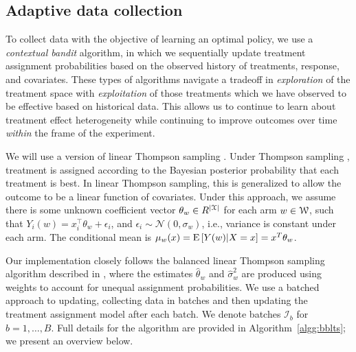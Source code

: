 \documentclass[letterpaper, 12pt, parskip=full,]{scrartcl}
\begin{document}
\subsection{Adaptive data collection}\label{adaptiveagent}

To collect data with the objective of learning an optimal policy, we use a \textit{contextual bandit} algorithm, in which we sequentially update treatment assignment probabilities based on the observed history of treatments, response, and covariates. These types of algorithms navigate a tradeoff in \textit{exploration} of the treatment space with \textit{exploitation} of those treatments which we have observed to be effective based on historical data. This allows us to continue to learn about treatment effect heterogeneity while continuing to improve outcomes over time \textit{within} the frame of the experiment. 

We will use a version of linear Thompson sampling \citep{agrawal2013thompson}. Under Thompson sampling \citep{thompson1933likelihood,thompson1935theory}, treatment is assigned according to the Bayesian posterior probability that each treatment is best. In linear Thompson sampling, this is generalized to allow the outcome to be a linear function of covariates. Under this approach, we assume there is some unknown coefficient vector $\theta_w\in R^{|{\EuScript X}|}$ for each arm $w \in {\EuScript W}$, such that $Y_i(w) = x_i^\top \theta_w + \epsilon_i$, and $\epsilon_i\sim \mathcal{N}(0, \sigma_w)$, i.e., variance is constant under each arm. The conditional mean is $\mu_w(x) = {\textrm E}\,[Y(w)|X=x] = x^T \theta_w$. 



Our implementation closely follows the balanced linear Thompson sampling algorithm described in \cite{dimakopoulou2017estimation, dimakopoulou2019balanced}, where the estimates $\hat\theta_w$ and $\hat\sigma^2_w$ are produced using weights to account for unequal assignment probabilities. We use a batched approach to updating, collecting data in batches and then updating the treatment assignment model after each batch. We denote batches $\mathcal{I}_b$ for $b = 1, \dots, B$. Full details for the algorithm are provided in Algorithm~\ref{algg:bblts}; we present an overview below. 
\end{document}

